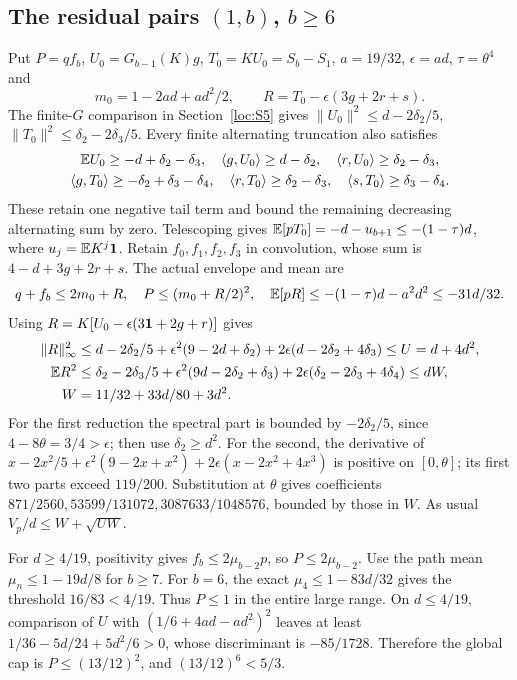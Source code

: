 \subsection[The residual pairs (1,b), b >= 6]{The residual pairs $(1,b)$, $b\ge6$}\label{loc:S7}
Put $P=qf_b$, $U_0=G_{b-1}(K)g$, $T_0=KU_0=S_b-S_1$,
$a=19/32$, $\epsilon=ad$, $\tau=\theta^4$ and
\[
 m_0=1-2ad+ad^2/2,\qquad R=T_0-\epsilon(3g+2r+s).
\]
The finite-$G$ comparison in Section~\ref{loc:S5} gives
$\|U_0\|^2\le d-2\delta_{2}/5$, $\|T_0\|^2\le \delta_{2}-2\delta_{3}/5$.
Every finite alternating truncation also satisfies
\begin{gather*}
 \mathbb E U_0\ge-d+\delta_{2}-\delta_{3},\quad
 \langle g,U_0\rangle\ge d-\delta_{2},\quad
 \langle r,U_0\rangle\ge \delta_{2}-\delta_{3},\\
 \langle g,T_0\rangle\ge-\delta_{2}+\delta_{3}-\delta_{4},\quad
 \langle r,T_0\rangle\ge \delta_{2}-\delta_{3},\quad
 \langle s,T_0\rangle\ge \delta_{3}-\delta_{4}.
\end{gather*}
These retain one negative tail term and bound the remaining decreasing
alternating sum by zero. Telescoping gives
$\mathbb E[pT_0]=-d-u_{b+1}\le-(1-\tau)d$, where $u_j=\mathbb E K^j\mathbf1$.
Retain $f_0,f_1,f_2,f_3$ in convolution, whose sum is
$4-d+3g+2r+s$. The actual envelope and mean are
\[
 q+f_b\le2m_0+R,\quad P\le(m_0+R/2)^2,\quad
 \mathbb E[pR]\le-(1-\tau)d-a^2d^2\le-31d/32.
\]
Using $R=K[U_0-\epsilon(3\mathbf1+2g+r)]$ gives
\begin{align*}
 \|R\|_\infty^2&\le d-2\delta_{2}/5+\epsilon^2(9-2d+\delta_{2})
                              +2\epsilon(d-2\delta_{2}+4\delta_{3})\le U=d+4d^2,\\
 \mathbb E R^2&\le \delta_{2}-2\delta_{3}/5+\epsilon^2(9d-2\delta_{2}+\delta_{3})
                              +2\epsilon(\delta_{2}-2\delta_{3}+4\delta_{4})\le dW,\\
 W&=11/32+33d/80+3d^2.
\end{align*}
For the first reduction the spectral part is bounded by $-2\delta_{2}/5$,
since $4-8\theta=3/4>\epsilon$; then use $\delta_{2}\ge d^2$.
For the second, the derivative of
$x-2x^2/5+\epsilon^2(9-2x+x^2)+2\epsilon(x-2x^2+4x^3)$
is positive on $[0,\theta]$; its first two parts exceed $119/200$.
Substitution at $\theta$ gives coefficients
$871/2560,53599/131072,3087633/1048576$, bounded by those in $W$.
As usual $V_p/d\le W+\sqrt{UW}$.

For $d\ge4/19$, positivity gives $f_b\le2\mu_{b-2}p$, so
$P\le2\mu_{b-2}$.
Use the path mean $\mu_n\le1-19d/8$ for $b\ge7$.
For $b=6$, the exact $\mu_4\le1-83d/32$ gives the threshold
$16/83<4/19$. Thus $P\le1$ in the entire large range.
On $d\le4/19$, comparison of $U$ with
$(1/6+4ad-ad^2)^2$ leaves at least
$1/36-5d/24+5d^2/6>0$, whose discriminant is $-85/1728$.
Therefore the global cap is $P\le(13/12)^2$, and $(13/12)^6<5/3$.

